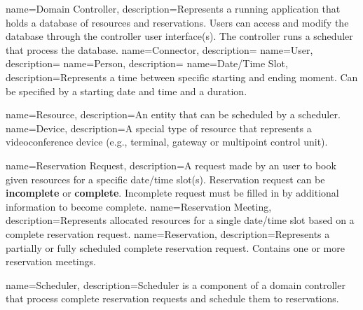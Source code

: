 %
%
{
  name=Domain Controller,
  description={Represents a running application that holds a database of resources and 
    reservations. Users can access and modify the database through the controller user 
    interface(s). The controller runs a scheduler that process the database.}
}
{
  name=Connector,
  description={\TODO{}}
}
{
  name=User,
  description={\TODO{}}
}
{
  name=Person,
  description={\TODO{}}
}
{
  name=Date/Time Slot,
  description={Represents a time between specific starting and ending moment. Can be 
    specified by a starting date and time and a duration.}
}

%
%
{
  name=Resource,
  description={An entity that can be scheduled by a scheduler.}
}
{
  name=Device,
  description={A special type of resource that represents a videoconference device (e.g., 
    terminal, gateway or multipoint control unit).}
}

%
%
{
  name=Reservation Request,
  description={A request made by an user to book given resources for a specific date/time 
    slot(s). Reservation request can be \textbf{incomplete} or \textbf{complete}. Incomplete 
    request must be filled in by additional information to become complete.
    }
}
{
  name=Reservation Meeting,
  description={Represents allocated resources for a single date/time slot based on a 
  complete reservation request.}
}
{
  name=Reservation,
  description={Represents a partially or fully scheduled complete reservation request. 
  Contains one or more reservation meetings.}
}

%
%
{
  name=Scheduler,
  description={Scheduler is a component of a domain controller that process complete 
    reservation requests and schedule them to reservations.}
}